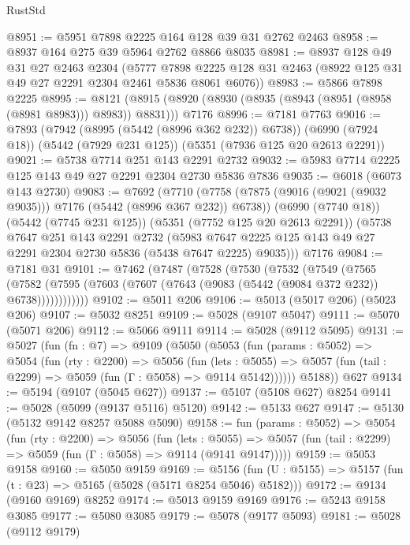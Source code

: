 \begin{lexlean}{RustStd}
\begin{coremodule}
{\begin{coremodule}
{{{{{{{{{{{{@8951 := @5951 @7898 @2225 @164 @128 @39 @31 @2762 @2463
@8958 := @8937 @164 @275 @39 @5964 @2762 @8866 @8035
@8981 := @8937
    @128
    @49
    @31
    @27
    @2463
    @2304
    (@5777 @7898 @2225 @128 @31 @2463 (@8922 @125 @31 @49 @27 @2291 @2304 @2461 @5836 @8061 @6076))
@8983 := @5866 @7898 @2225
@8995 := @8121
    (@8915 (@8920 (@8930 (@8935 (@8943 (@8951 (@8958 (@8981 @8983))) @8983)) @8831)))
    @7176
@8996 := @7181 @7763
@9016 := @7893
    (@7942 (@8995 (@5442 (@8996 @362 @232)) @6738))
    (@6990 (@7924 @18))
    (@5442 (@7929 @231 @125))
    (@5351 (@7936 @125 @20 @2613 @2291))
@9021 := @5738 @7714 @251 @143 @2291 @2732
@9032 := @5983 @7714 @2225 @125 @143 @49 @27 @2291 @2304 @2730 @5836 @7836
@9035 := @6018 (@6073 @143 @2730)
@9083 := @7692
    (@7710
      (@7758 (@7875 (@9016 (@9021 (@9032 @9035))) @7176 (@5442 (@8996 @367 @232)) @6738))
      (@6990 (@7740 @18))
      (@5442 (@7745 @231 @125))
      (@5351 (@7752 @125 @20 @2613 @2291))
      (@5738
        @7647
        @251
        @143
        @2291
        @2732
        (@5983 @7647 @2225 @125 @143 @49 @27 @2291 @2304 @2730 @5836 (@5438 @7647 @2225) @9035)))
    @7176
@9084 := @7181 @31
@9101 := @7462
    (@7487
      (@7528
        (@7530
          (@7532
            (@7549
              (@7565
                (@7582
                  (@7595 (@7603 (@7607 (@7643 (@9083 (@5442 (@9084 @372 @232)) @6738))))))))))))
@9102 := @5011 @206
@9106 := @5013 (@5017 @206) (@5023 @206)
@9107 := @5032 @8251
@9109 := @5028 (@9107 @5047)
@9111 := @5070 (@5071 @206)
@9112 := @5066 @9111
@9114 := @5028 (@9112 @5095)
@9131 := @5027
    (fun (fn : @7) =>
    @9109
      (@5050
        (@5053
          (fun (params : @5052) =>
          @5054
            (fun (rty : @2200) =>
            @5056
              (fun (lets : @5055) =>
              @5057 (fun (tail : @2299) => @5059 (fun (Γ : @5058) => @9114 @5142))))))
        @5188))
    @627
@9134 := @5194 (@9107 (@5045 @627))
@9137 := @5107 (@5108 @627) @8254
@9141 := @5028 (@5099 (@9137 @5116) @5120)
@9142 := @5133 @627
@9147 := @5130 (@5132 @9142 @8257 @5088 @5090)
@9158 := fun (params : @5052) =>
  @5054
    (fun (rty : @2200) =>
    @5056
      (fun (lets : @5055) =>
      @5057 (fun (tail : @2299) => @5059 (fun (Γ : @5058) => @9114 (@9141 @9147)))))
@9159 := @5053 @9158
@9160 := @5050 @9159
@9169 := @5156 (fun (U : @5155) => @5157 (fun (t : @23) => @5165 (@5028 (@5171 @8254 @5046) @5182)))
@9172 := @9134 (@9160 @9169) @8252
@9174 := @5013 @9159 @9169
@9176 := @5243 @9158 @3085
@9177 := @5080 @3085
@9179 := @5078 (@9177 @5093)
@9181 := @5028 (@9112 @9179)
}}}}}}}}}}}}
\end{coremodule}}
\end{coremodule}
\end{lexlean}
